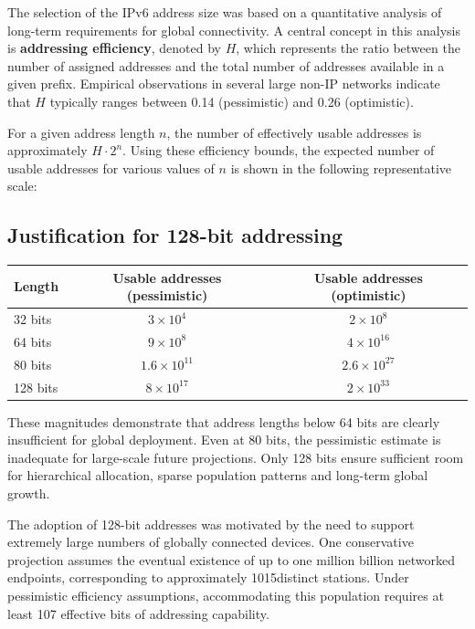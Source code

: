 The selection of the IPv6 address size was based on a quantitative analysis of long-term requirements for global connectivity. A central concept in this analysis is \textbf{addressing efficiency}, denoted by $H$, which represents the ratio between the number of assigned addresses and the total number of addresses available in a given prefix. Empirical observations in several large non-IP networks indicate that $H$ typically ranges between 0.14 (pessimistic) and 0.26 (optimistic).

For a given address length $n$, the number of effectively usable addresses is approximately $H \cdot 2^n$. Using these efficiency bounds, the expected number of usable addresses for various values of $n$ is shown in the following representative scale:

\subsection{Justification for 128-bit addressing}

\begin{center}
\begin{tabular}{@{}lcc@{}}
\toprule
\textbf{Length} & \textbf{Usable addresses (pessimistic)} & \textbf{Usable addresses (optimistic)}\\
\midrule
32 bits & $3 \times 10^{4}$ & $2 \times 10^{8}$\\
64 bits & $9 \times 10^{8}$ & $4 \times 10^{16}$\\
80 bits & $1.6 \times 10^{11}$ & $2.6 \times 10^{27}$\\
128 bits & $8 \times 10^{17}$ & $2 \times 10^{33}$\\
\bottomrule
\end{tabular}
\end{center}

These magnitudes demonstrate that address lengths below 64 bits are clearly insufficient for global deployment. Even at 80 bits, the pessimistic estimate is inadequate for large-scale future projections. Only 128 bits ensure sufficient room for hierarchical allocation, sparse population patterns and long-term global growth.

The adoption of 128-bit addresses was motivated by the need to support extremely large numbers of globally connected devices. One conservative projection assumes the eventual existence of up to one million billion networked endpoints, corresponding to approximately 1015distinct stations. Under pessimistic efficiency assumptions, accommodating this population requires at least 107 effective bits of addressing capability.

